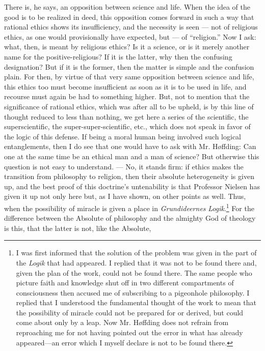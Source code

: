 \documentclass[12pt,a4paper,openany]{book}
\renewcommand{\thefootnote}{*)}
\newcommand{\fnmark}[2]{\renewcommand{\thefootnote}{#1}\footnote{#2}%
  \renewcommand{\thefootnote}{*)}}
\newcommand{\opage}[1]{\marginnote{\footnotesize\textit{[#1]}}}
\begin{document}
There is, he says, an opposition between science and
life. When the idea of the good is to be realized in deed,
this opposition comes forward in such a way that rational ethics shows
its insufficiency, and the necessity is seen --- not of religious
ethics, as one would provisionally have expected, but --- of
``religion.'' Now I ask: what, then, is meant by religious
ethics? Is it a science, or is it merely another name
for the positive-religious? If it is the latter, why then the
confusing designation? But if it is the former, then the matter is
simple and the confusion plain. For then, by virtue of that very
same opposition between science and life, this ethics too must
become insufficient as soon as it is to be used in life, and
recourse must again be had to something higher. But, not to mention that
the significance of rational ethics, which was after all to be upheld,
is by this line of thought reduced to less than nothing, we get
here a series of the scientific, the superscientific, the super-super-scientific,
etc., which does not speak in favor of the logic of this
defense. If being a moral human being involved such
logical entanglements, then I do see that one would have to ask with Mr.
Høffding: Can one at the same time be an ethical man and a
man of science? But otherwise this question is not easy to
understand. --- No, it stands firm: if ethics makes the transition from
philosophy to religion, then their absolute heterogeneity is given up, and
the best proof of this doctrine's untenability is that
Professor Nielsen has given it up not only here but, as
I have shown, on other points as well. Thus,
when the possibility of miracle is given a place in \emph{Grundideernes}
\opage{20}\emph{Logik}.\fnmark{*)}{I was first informed that the solution of the problem
was given in the part of the \emph{Logik} that had appeared. I replied that
it was not to be found there and, given the plan of the work, could not be
found there. The same people who picture faith and knowledge shut off
in two different compartments of consciousness then accused me of
subscribing to a pigeonhole philosophy. I replied that I understood the
fundamental thought of the work to mean that the possibility of miracle
could not be prepared for or derived, but could come about only by a leap.
Now Mr. Høffding does not refrain from reproaching me for not having
pointed out the error in what has already appeared---an error which I myself
declare is not to be found there.}
For the difference between the Absolute of philosophy and the
almighty God of theology is this, that the latter is not, like the Absolute,
\end{document}
